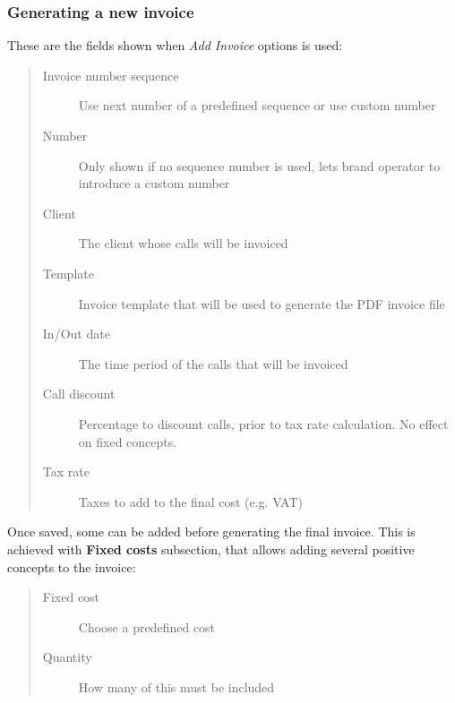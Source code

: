 \documentclass[letterpaper,10pt,spanish]{sphinxmanual}
\begin{document}
\subsubsection{Generating a new invoice}
\label{administration_portal/brand/invoicing/invoices:generating-a-new-invoice}
These are the fields shown when \emph{Add Invoice} options is used:
\begin{quote}
\begin{description}
\item[{Invoice number sequence}] \leavevmode
Use next number of a predefined sequence or use custom number

\item[{Number}] \leavevmode
Only shown if no sequence number is used, lets brand operator to introduce a custom number

\item[{Client}] \leavevmode
The client whose calls will be invoiced

\item[{Template}] \leavevmode
Invoice template that will be used to generate the PDF invoice file

\item[{In/Out date}] \leavevmode
The time period of the calls that will be invoiced

\item[{Call discount}] \leavevmode
Percentage to discount calls, prior to tax rate calculation. No effect on fixed concepts.

\item[{Tax rate}] \leavevmode
Taxes to add to the final cost (e.g. VAT)

\end{description}
\end{quote}

Once saved, some {\hyperref[administration_portal/brand/invoicing/fixed_costs:fixed\string-costs]{}} can be added before generating the final invoice. This is achieved with \textbf{Fixed costs}
subsection, that allows adding several positive concepts to the invoice:
\begin{quote}
\begin{description}
\item[{Fixed cost}] \leavevmode
Choose a predefined cost

\item[{Quantity}] \leavevmode
How many of this must be included

\end{description}
\end{quote}
\end{document}
